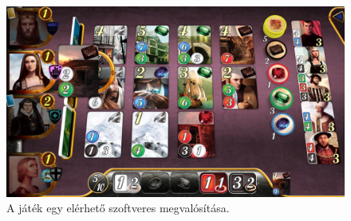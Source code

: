 \begin{figure}[h]
	\centering
	\includegraphics[scale=0.2]{images/digital_edition.jpg}
	\caption{A játék egy elérhető szoftveres megvalósítása.}
	\label{fig:digital}
\end{figure}